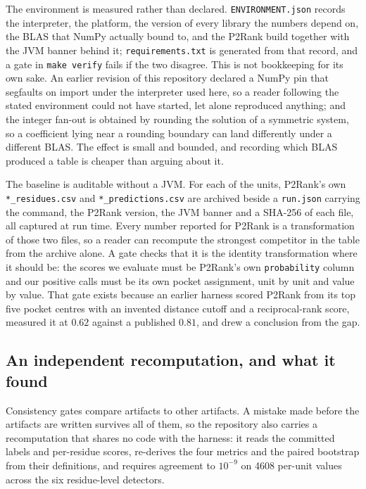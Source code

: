 \documentclass[11pt]{article}
\begin{document}
The environment is measured rather than declared. \texttt{ENVIRONMENT.json}
records the interpreter, the platform, the version of every library the numbers
depend on, the BLAS that NumPy actually bound to, and the P2Rank build together
with the JVM banner behind it; \texttt{requirements.txt} is generated from that
record, and a gate in \texttt{make verify} fails if the two disagree. This is not
bookkeeping for its own sake. An earlier revision of this repository declared a
NumPy pin that segfaults on import under the interpreter used here, so a reader
following the stated environment could not have started, let alone reproduced
anything; and the integer fan-out is obtained by rounding the solution of a
symmetric system, so a coefficient lying near a rounding boundary can land
differently under a different BLAS. The effect is small and bounded, and
recording which BLAS produced a table is cheaper than arguing about it.

The baseline is auditable without a JVM. For each of the \NUnits{} units,
P2Rank's own \texttt{*\_residues.csv} and \texttt{*\_predictions.csv} are
archived beside a \texttt{run.json} carrying the command, the P2Rank version,
the JVM banner and a SHA-256 of each file, all captured at run time. Every
number reported for P2Rank is a transformation of those two files, so a reader
can recompute the strongest competitor in the table from the archive alone. A
gate checks that it is the identity transformation where it should be: the
scores we evaluate must be P2Rank's own \texttt{probability} column and our
positive calls must be its own pocket assignment, unit by unit and value by
value. That gate exists because an earlier harness scored P2Rank from its top
five pocket centres with an invented distance cutoff and a reciprocal-rank
score, measured it at \(0.62\) against a published \(0.81\), and drew a
conclusion from the gap.

\subsection{An independent recomputation, and what it found}
Consistency gates compare artifacts to other artifacts. A mistake made before
the artifacts are written survives all of them, so the repository also carries a
recomputation that shares no code with the harness: it reads the committed
labels and per-residue scores, re-derives the four metrics and the paired
bootstrap from their definitions, and requires agreement to \(10^{-9}\) on 4608
per-unit values across the six residue-level detectors.
\end{document}
